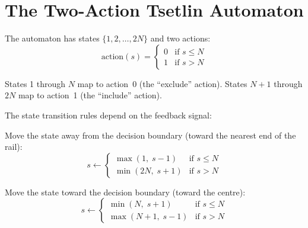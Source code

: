 \section{The Two-Action Tsetlin Automaton}
\label{sec:two-action}

\begin{definition}
\label{def:tsetlin-automaton}
The automaton has states $\{1, 2, \ldots, 2N\}$ and two actions:
\begin{equation}
  \text{action}(s) = \begin{cases}
    0 & \text{if } s \leq N \\
    1 & \text{if } s > N
  \end{cases}
  \label{eq:action}
\end{equation}

States 1 through $N$ map to action~0 (the ``exclude'' action).
States $N{+}1$ through $2N$ map to action~1 (the ``include'' action).
\end{definition}

The state transition rules depend on the feedback signal:

\begin{description}[leftmargin=1em]
  \item[Reward:] Move the state away from the decision boundary
    (toward the nearest end of the rail):
    \begin{equation}
      s \leftarrow \begin{cases}
        \max(1, \; s - 1) & \text{if } s \leq N \\
        \min(2N, \; s + 1) & \text{if } s > N
      \end{cases}
      \label{eq:reward}
    \end{equation}

  \item[Penalty:] Move the state toward the decision boundary
    (toward the centre):
    \begin{equation}
      s \leftarrow \begin{cases}
        \min(N, \; s + 1) & \text{if } s \leq N \\
        \max(N{+}1, \; s - 1) & \text{if } s > N
      \end{cases}
      \label{eq:penalty}
    \end{equation}
\end{description}

